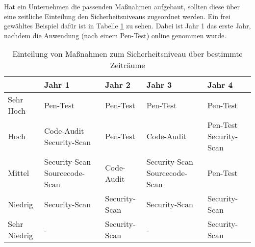 Hat ein Unternehmen die passenden Maßnahmen aufgebaut, sollten diese über eine zeitliche Einteilung den Sicherheitsniveaus zugeordnet werden. Ein frei gewähltes Beispiel dafür ist in Tabelle \ref{tab:PenKontinuitaet} zu sehen. Dabei ist Jahr 1 das erste Jahr, nachdem die Anwendung (nach einem Pen-Test) online genommen wurde.

\begin{table}
	\begin{tabularx}{\textwidth}{l||p{2.8cm}|p{2.8cm}|p{2.8cm}|p{2.8cm}}
		& Jahr 1 & Jahr 2 & Jahr 3 & Jahr 4 \tabularnewline \hline\hline
	Sehr Hoch  & Pen-Test & Pen-Test & Pen-Test & Pen-Test \tabularnewline \hline
	Hoch  & Code-Audit \newline Security-Scan & Pen-Test & Code-Audit & Pen-Test \newline Security-Scan \tabularnewline \hline
	Mittel  & Security-Scan \newline Sourcecode-Scan & Code-Audit & Security-Scan \newline Sourcecode-Scan  & Pen-Test \tabularnewline \hline
	Niedrig  & Security-Scan & Security-Scan & Security-Scan & Security-Scan \tabularnewline \hline
	Sehr Niedrig  & - & Security-Scan & - & Security-Scan \tabularnewline
	\end{tabularx}

	\label{tab:PenKontinuitaet}
	\caption{Einteilung von Maßnahmen zum Sicherheitsniveau über bestimmte Zeiträume}
\end{table}
